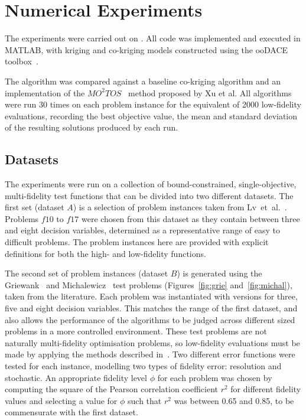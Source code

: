 \section{Numerical Experiments}\label{sec:exp}
The experiments were carried out on . All code was implemented and executed in MATLAB, with kriging and co-kriging models constructed using the ooDACE toolbox~\cite{oodace}.

The \AlgName{} algorithm was compared against a baseline co-kriging algorithm and an implementation of the $MO^2TOS$~\cite{xu2016mo2tos} method proposed by Xu et al. All algorithms were run 30 times on each problem instance for the equivalent of 2000 low-fidelity evaluations, recording the best objective value, the mean and standard deviation of the resulting solutions produced by each run.


\subsection{Datasets}
The experiments were run on a collection of bound-constrained, single-objective, multi-fidelity test functions that can be divided into two different datasets. The first set (dataset $A$) is a selection of problem instances taken from Lv~et~al.~\cite{lv2021multi}. Problems $f10$ to $f17$ were chosen from this dataset as they contain between three and eight decision variables, determined as a representative range of easy to difficult problems. The problem instances here are provided with explicit definitions for both the high- and low-fidelity functions.

The second set of problem instances (dataset $B$) is generated using the Griewank~\cite{griewank1981generalized} and Michalewicz~\cite{michalewicz2013genetic} test problems (Figures~\ref{fig:grie} and~\ref{fig:michal}), taken from the literature. Each problem was instantiated with versions for three, five and eight decision variables. This matches the range of the first dataset, and also allows the performance of the algorithms to be judged across different sized problems in a more controlled environment. These test problems are not naturally multi-fidelity optimisation problems, so low-fidelity evaluations must be made by applying the methods described in~\cite{wang2017generic}. Two different error functions were tested for each instance, modelling two types of fidelity error: resolution and stochastic. An appropriate fidelity level $\phi$ for each problem was chosen by computing the square of the Pearson correlation coefficient $r^2$ for different fidelity values and selecting a value for $\phi$ such that $r^2$ was between 0.65 and 0.85, to be commensurate with the first dataset.

